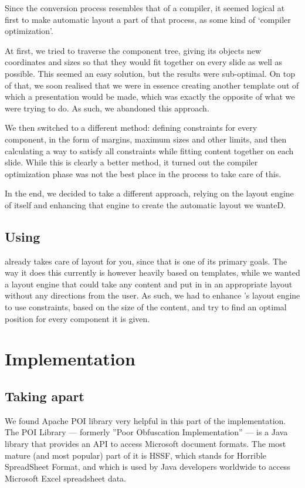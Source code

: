\documentclass[a4paper,12pt]{report}
\begin{document}
   Since the conversion process resembles that of a compiler, it seemed logical
   at first to make automatic layout a part of that process, as some kind of
   `compiler optimization'.

   At first, we tried to traverse the component tree, giving its objects new
   coordinates and sizes so that they would fit together on every slide as well
   as possible. This seemed an easy solution, but the results were sub-optimal.
   On top of that, we soon realised that we were in essence creating another
   template out of which a presentation would be made, which was exactly the
   opposite of what we were trying to do. As such, we abandoned this approach.

   We then switched to a different method: defining constraints for every
   component, in the form of margins, maximum sizes and other limits, and then
   calculating a way to satisfy all constraints while fitting content together
   on each slide. While this is clearly a better method, it turned out the
   compiler optimization phase was not the best place in the process to take
   care of this.

   In the end, we decided to take a different approach, relying on the layout
   engine of \mxp itself and enhancing that engine to create the automatic
   layout we wanteD.

  \section{Using \mxp}

   \mxp already takes care of layout for you, since that is one of its primary
   goals. The way it does this currently is however heavily based on templates,
   while we wanted a layout engine that could take any content and put in in an
   appropriate layout without any directions from the user. As such, we had to
   enhance \mxp's layout engine to use constraints, based on the size of the
   content, and try to find an optimal position for every component it is
   given.

 \chapter{Implementation}

  \section{Taking \ppt apart}

   We found Apache POI library very helpful in this part of the implementation.
   The POI Library --- formerly ''Poor Obfuscation Implementation''
   \citep{sundaram-1} --- is a Java library that provides an API to access
   Microsoft document formats. The most mature (and most popular) part of it is
   HSSF, which stands for Horrible SpreadSheet Format, and which is used by
   Java developers worldwide to access Microsoft Excel spreadsheet data. 
\end{document}
